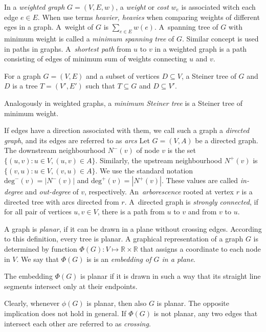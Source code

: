 In a \emph{weighted graph} $G=(V,E,w)$, a \emph{weight} or \emph{cost} $w_e$ is associated witch each edge $e\in E$.
When use terms \emph{heavier, heavies} when comparing weights of different eges in a graph.
A~weight of $G$ is $\sum_{e\in E}w(e)$.
A~spanning tree of $G$ with minimum weight is called a \emph{minimum spanning tree} of $G$.
Similar concept is used in paths in graphs.
A~\emph{shortest path} from $u$ to $v$ in a weighted graph is a path consisting of edges of minimum sum of weights connecting $u$ and $v$.
\begin{definition}
	For a graph $G=(V,E)$ and a subset of vertices $D\subseteq V$, a Steiner tree of $G$ and $D$ is a tree $T=(V',E')$ such that $T\subseteq G$ and $D\subseteq V'$.
\end{definition}
Analogously in weighted graphs, a \emph{minimum Steiner tree} is a Steiner tree of minimum weight.

If edges have a direction associated with them, we call such a graph a \emph{directed graph}, and its edges are referred to as \emph{arcs}
Let $G=(V,A)$ be a directed graph. 
The downstream neighbourhood $N^-(v)$ of node $v$ is the set $\{(u,v): u\in V, (u,v) \in A\}$. 
Similarly, the upstream neighbourhood $N^+(v)$ is $\{(v,u): u\in V, (v,u) \in A\}$.
We use the standard notation $\text{deg}^-(v)=|N^-(v)|$ and $\text{deg}^+(v)=|N^+(v)|$.
These values are called \emph{in-degree} and \emph{out-degree} of $v$, respectively.
An~\emph{arborescence} rooted at vertex $r$ is a directed tree with arcs directed from $r$.
A~directed graph is \emph{strongly connected}, if for all pair of vertices $u,v\in V$, there is a path from $u$ to $v$ and from $v$ to $u$.

A graph is \emph{planar}, if it can be drawn in a plane without crossing edges.
According to this definition, every tree is planar. 
A graphical representation of a graph $G$ is determined by function $\Phi(G):V\mapsto\mathbb{R}\times\mathbb{R}$ that assigns a coordinate to each node in $V$. 
We say that $\Phi(G)$ is is an \emph{embedding of $G$ in a plane}.
\begin{definition}\label{def:planemb}
The embedding $\Phi(G)$ is planar if it is drawn in such a way that its straight line segments intersect only at their endpoints.
\end{definition}
Clearly, whenever $\phi(G)$ is planar, then also $G$ is planar. 
The opposite implication does not hold in general. 
If $\Phi(G)$ is not planar, any two edges that intersect each other are referred to as \emph{crossing}.

